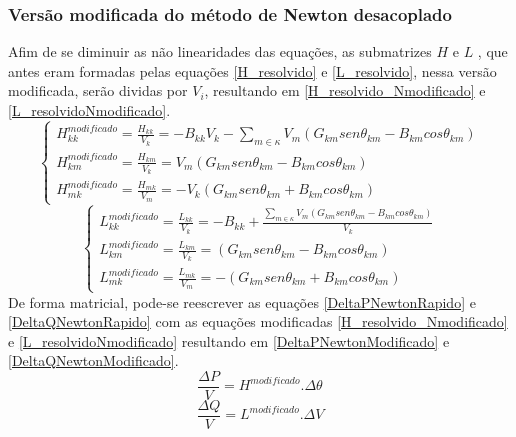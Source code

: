 \subsubsection{Versão modificada do método de Newton desacoplado}
\label{SubsectionNewtonModificado}
Afim de se diminuir as não linearidades das equações, as submatrizes $H$ e $L$ , que antes eram formadas pelas equações \ref{H_resolvido} e \ref{L_resolvido}, nessa versão modificada, serão dividas por $V_i$, resultando em \ref{H_resolvido_Nmodificado} e \ref{L_resolvidoNmodificado}.
\begin{equation}
  \left\{    \begin{array}{lll}
                H_{kk}^{modificado}=\frac{H_{kk}}{V_k} = -B_{kk}V_k - \sum_{m\in \kappa} V_m(G_{km} sen\theta_{km} - B_{km}cos\theta_{km})\\
                H_{km}^{modificado} = \frac{H_{km}}{V_k} = V_m (G_{km} sen\theta_{km} - B_{km}cos\theta_{km})\\
                H_{mk}^{modificado} = \frac{H_{mk}}{V_m} = -V_k (G_{km} sen\theta_{km} + B_{km}cos\theta_{km})
            \end{array}\right.
    \label{H_resolvido_Nmodificado}
\end{equation}
\begin{equation}
  \left\{    \begin{array}{lll}
                L_{kk}^{modificado} = \frac{L_{kk}}{V_k} = -B_{kk} +\frac{\sum_{m\in \kappa} V_m(G_{km} sen\theta_{km} - B_{km}cos\theta_{km})}{V_k} \\
                 L_{km}^{modificado} = \frac{L_{km}}{V_k} = (G_{km} sen\theta_{km} - B_{km}cos\theta_{km})\\
                L_{mk}^{modificado} = \frac{L_{mk}}{V_m} =-(G_{km} sen\theta_{km} +B_{km}cos\theta_{km})
            \end{array}\right.
    \label{L_resolvidoNmodificado}
\end{equation}
De forma matricial, pode-se reescrever as equações \ref{DeltaPNewtonRapido} e \ref{DeltaQNewtonRapido} com as equações modificadas \ref{H_resolvido_Nmodificado} e \ref{L_resolvidoNmodificado} resultando em \ref{DeltaPNewtonModificado} e \ref{DeltaQNewtonModificado}. 
\begin{equation}
    \frac{\Delta P}{V} = H^{modificado}.\Delta\theta
    \label{DeltaPNewtonModificado}
\end{equation}
\begin{equation}
    \frac{\Delta Q}{V} = L^{modificado}.\Delta V
    \label{DeltaQNewtonModificado}
\end{equation}

